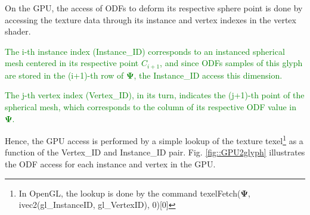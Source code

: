 \documentclass[twoside,twocolumn,10pt]{article}
\begin{document}
On the GPU, the access of ODFs to deform its respective sphere point is done by accessing the texture data through its instance and vertex indexes in the vertex shader.

\textcolor{green}{The i-th instance index (Instance\_ID) corresponds to an instanced spherical mesh centered in its respective point $C_{i+1}$, and since ODFs samples of this glyph are stored in the (i+1)-th row of $\bm{\Psi}$, the Instance\_ID access this dimension.}

\textcolor{green}{The j-th vertex index (Vertex\_ID), in its turn, indicates the (j+1)-th point of the spherical mesh, which corresponds to the column of its respective ODF value in $\bm{\Psi}$.}

Hence, the GPU access is performed by a simple lookup of the texture texel\footnote{In OpenGL, the lookup is done by the command texelFetch($\bm{\Psi}$, ivec2(gl\_InstanceID, gl\_VertexID), 0)[0]} as a function of the Vertex\_ID and Instance\_ID pair. Fig. \ref{fig::GPU2glyph} illustrates the ODF access for each instance and vertex in the GPU.


\end{document}
